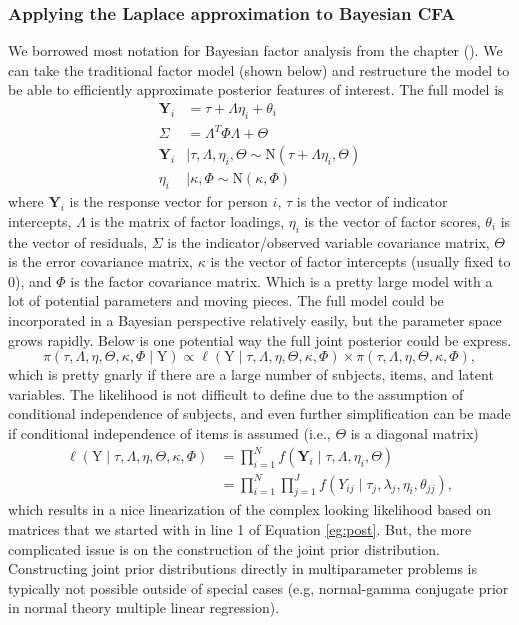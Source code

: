 \documentclass[noextraspace, floatsintext, 12pt]{apa7}
\begin{document}
\subsubsection{Applying the Laplace approximation to Bayesian CFA}

We borrowed most notation for Bayesian factor analysis from the chapter ().
 We can take the traditional factor model (shown below) and restructure the model to be able to efficiently approximate posterior features of interest.
The full model is
\begin{align*}
\mathbf{Y}_i &= \tau + \Lambda \eta_i + \theta_i\\
\Sigma &= \Lambda^T \Phi \Lambda + \Theta\\
\mathbf{Y}_i &\mid \tau, \Lambda, \eta_i, \Theta \sim \mathrm{N}\left(\tau + \Lambda \eta_i, \Theta \right)\\
\eta_i &\mid \kappa, \Phi \sim \mathrm{N}\left(\kappa, \Phi \right)
\end{align*}
where $\mathbf{Y}_i$ is the response vector for person $i$, $\tau$ is the vector of indicator intercepts, $\Lambda$ is the matrix of factor loadings, $\eta_i$ is the vector of factor scores, $\theta_i$ is the vector of residuals, $\Sigma$ is the indicator/observed variable covariance matrix, $\Theta$ is the error covariance matrix, $\kappa$ is the vector of factor intercepts (usually fixed to 0), and $\Phi$ is the factor covariance matrix.
Which is a pretty large model with a lot of potential parameters and moving pieces.
The full model could be incorporated in a Bayesian perspective relatively easily, but the parameter space grows rapidly.
Below is one potential way the full joint posterior could be express.
\begin{equation} \label{eg:post}
\pi\left(\tau, \Lambda, \eta,\Theta, \kappa, \Phi\mid \mathrm{Y}\right) \propto \ell\left(\mathrm{Y} \mid \tau, \Lambda, \eta,\Theta, \kappa, \Phi\right) \times \pi\left(\tau, \Lambda, \eta,\Theta, \kappa, \Phi\right),
\end{equation}
which is pretty gnarly if there are a large number of subjects, items, and latent variables.
The likelihood is not difficult to define due to the assumption of conditional independence of subjects, and even further simplification can be made if conditional independence of items is assumed (i.e., $\Theta$ is a diagonal matrix)
\begin{align*}
\ell\left(\mathrm{Y} \mid \tau, \Lambda, \eta,\Theta, \kappa, \Phi\right) &= \prod_{i=1}^{N} f\left(\mathbf{Y}_i \mid \tau, \Lambda, \eta_i, \Theta \right)\\
 &=\prod_{i=1}^{N} \prod_{j=1}^{J}f\left(Y_{ij} \mid \tau_j, \lambda_{j}, \eta_i, \theta_{jj} \right),
\end{align*}
which results in a nice linearization of the complex looking likelihood based on matrices that we started with in line 1 of Equation \ref{eg:post}.
But, the more complicated issue is on the construction of the joint prior distribution.
Constructing joint prior distributions directly in multiparameter problems is typically not possible outside of special cases (e.g, normal-gamma conjugate prior in normal theory multiple linear regression).
\end{document}
